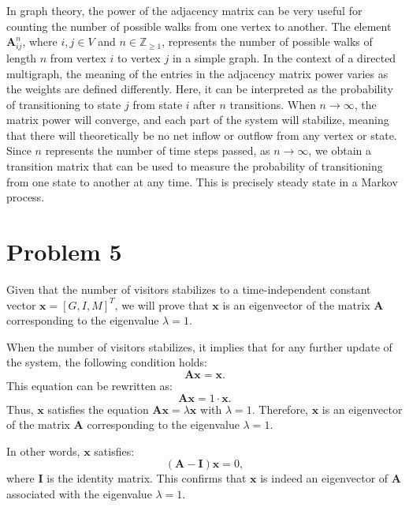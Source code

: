 \documentclass[12pt,a4paper]{article}
\begin{document}
\begin{solution}
\begin{remark}
In graph theory, the power of the adjacency matrix can be very useful for counting the number of possible walks from one vertex to another. The element $\mathbf{A}_{ij}^n$, where $i,j \in V$ and $n \in \mathbb{Z}_{\geq 1}$, represents the number of possible walks of length $n$ from vertex $i$ to vertex $j$ in a simple graph. In the context of a directed multigraph, the meaning of the entries in the adjacency matrix power varies as the weights are defined differently. Here, it can be interpreted as the probability of transitioning to state $j$ from state $i$ after $n$ transitions. When $n \to \infty$, the matrix power will converge, and each part of the system will stabilize, meaning that there will theoretically be no net inflow or outflow from any vertex or state. Since $n$ represents the number of time steps passed, as $n \to \infty$, we obtain a transition matrix that can be used to measure the probability of transitioning from one state to another at any time. This is precisely steady state in a Markov process.
\end{remark}
\end{solution}

\section*{Problem 5}
\begin{solution}
Given that the number of visitors stabilizes to a time-independent constant vector \( \mathbf{x} = [G,I,M]^T \), we will prove that \( \mathbf{x} \) is an eigenvector of the matrix \( \mathbf{A} \) corresponding to the eigenvalue \( \lambda = 1 \).

When the number of visitors stabilizes, it implies that for any further update of the system, the following condition holds:
\[
\mathbf{A}\mathbf{x} = \mathbf{x}.
\]
This equation can be rewritten as:
\[
\mathbf{A}\mathbf{x} = 1 \cdot \mathbf{x}.
\]
Thus, \( \mathbf{x} \) satisfies the equation \( \mathbf{A}\mathbf{x} = \lambda \mathbf{x} \) with \( \lambda = 1 \). Therefore, \( \mathbf{x} \) is an eigenvector of the matrix \( \mathbf{A} \) corresponding to the eigenvalue \( \lambda = 1 \).

In other words, \( \mathbf{x} \) satisfies:
\[
(\mathbf{A} - \mathbf{I})\mathbf{x} = 0,
\]
where \( \mathbf{I} \) is the identity matrix. This confirms that \( \mathbf{x} \) is indeed an eigenvector of \( \mathbf{A} \) associated with the eigenvalue \( \lambda = 1 \).
\end{solution}
\end{document}
